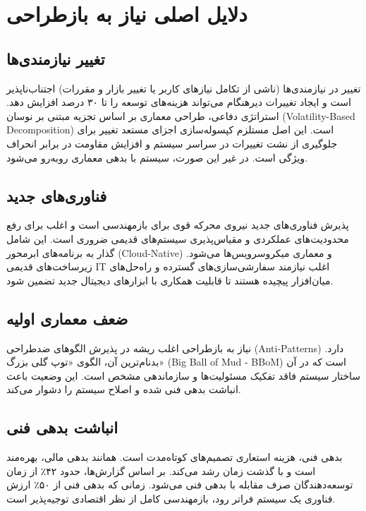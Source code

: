 \section{دلایل اصلی نیاز به بازطراحی}
\label{sec:ch4-reasons}

\subsection{تغییر نیازمندی‌ها}
تغییر در نیازمندی‌ها (ناشی از تکامل نیازهای کاربر یا تغییر بازار و مقررات) اجتناب‌ناپذیر است و ایجاد تغییرات دیرهنگام می‌تواند هزینه‌های توسعه را تا ۳۰ درصد افزایش دهد. استراتژی دفاعی، طراحی معماری بر اساس تجزیه مبتنی بر نوسان (Volatility-Based Decomposition) است. این اصل مستلزم کپسوله‌سازی اجزای مستعد تغییر برای جلوگیری از نشت تغییرات در سراسر سیستم و افزایش مقاومت در برابر انحراف ویژگی است. در غیر این صورت، سیستم با بدهی معماری روبه‌رو می‌شود.

\subsection{فناوری‌های جدید}
پذیرش فناوری‌های جدید نیروی محرکه قوی برای بازمهندسی است و اغلب برای رفع محدودیت‌های عملکردی و مقیاس‌پذیری سیستم‌های قدیمی ضروری است. این شامل گذار به برنامه‌های ابرمحور (Cloud-Native) و معماری میکروسرویس‌ها می‌شود. زیرساخت‌های قدیمی IT اغلب نیازمند سفارشی‌سازی‌های گسترده و راه‌حل‌های میان‌افزار پیچیده هستند تا قابلیت همکاری با ابزارهای دیجیتال جدید تضمین شود.

\subsection{ضعف معماری اولیه}
نیاز به بازطراحی اغلب ریشه در پذیرش الگوهای ضدطراحی (Anti-Patterns) دارد. بدنام‌ترین آن، الگوی «توپ گلی بزرگ» (Big Ball of Mud - BBoM) است که در آن ساختار سیستم فاقد تفکیک مسئولیت‌ها و سازماندهی مشخص است. این وضعیت باعث انباشت بدهی فنی شده و اصلاح سیستم را دشوار می‌کند.

\subsection{انباشت بدهی فنی}
بدهی فنی، هزینه استعاری تصمیم‌های کوتاه‌مدت است. همانند بدهی مالی، بهره‌مند است و با گذشت زمان رشد می‌کند. بر اساس گزارش‌ها، حدود ۴۲٪ از زمان توسعه‌دهندگان صرف مقابله با بدهی فنی می‌شود. زمانی که بدهی فنی از ۵۰٪ ارزش فناوری یک سیستم فراتر رود، بازمهندسی کامل از نظر اقتصادی توجیه‌پذیر است.
